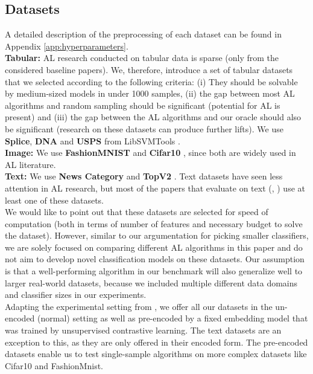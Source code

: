 \documentclass[]{article}
\begin{document}
\subsection{Datasets}\label{sec:datasets}
A detailed description of the preprocessing of each dataset can be found in Appendix \ref{app:hyperparameters}. \\ [1mm]
\textbf{Tabular:}
AL research conducted on tabular data is sparse (only \cite{ashdeep} from the considered baseline papers). 
We, therefore, introduce a set of tabular datasets that we selected according to the following criteria:
(i) They should be solvable by medium-sized models in under 1000 samples, (ii) the gap between most AL algorithms and random sampling should be significant (potential for AL is present) and (iii) the gap between the AL algorithms and our oracle should also be significant (research on these datasets can produce further lifts).
We use \textbf{Splice}, \textbf{DNA} and \textbf{USPS} from LibSVMTools \cite{libsvmtools}.\\
\textbf{Image:}
We use \textbf{FashionMNIST} \cite{xiao2017fashion} and \textbf{Cifar10} \cite{krizhevsky2009learning}, since both are widely used in AL literature.\\
\textbf{Text:}
We use \textbf{News Category} \cite{misra2022news} and \textbf{TopV2} \cite{chen-etal-2020-low-resource}.
Text datasets have seen less attention in AL research, but most of the papers that evaluate on text (\cite{hu2021towards}, \cite{zhou2021towards}) use at least one of these datasets.\\ [1mm]
%
We would like to point out that these datasets are selected for speed of computation (both in terms of number of features and necessary budget to solve the dataset). 
However, similar to our argumentation for picking smaller classifiers, we are solely focused on comparing different AL algorithms in this paper and do not aim to develop novel classification models on these datasets.
Our assumption is that a well-performing algorithm in our benchmark will also generalize well to larger real-world datasets, because we included multiple different data domains and classifier sizes in our experiments. \\ [1mm]
Adapting the experimental setting from \cite{hacohen2022active}, we offer all our datasets in the un-encoded (normal) setting as well as pre-encoded by a fixed embedding model that was trained by unsupervised contrastive learning. 
The text datasets are an exception to this, as they are only offered in their encoded form.
The pre-encoded datasets enable us to test single-sample algorithms on more complex datasets like Cifar10 and FashionMnist.
\end{document}
